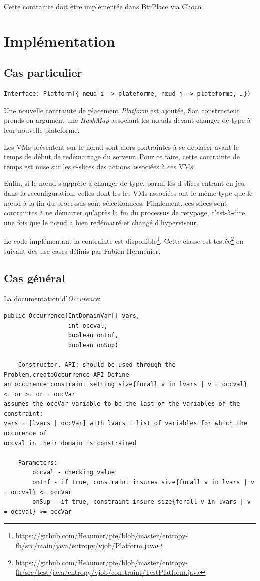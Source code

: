 \documentclass[a4paper]{article}
\begin{document}
Cette contrainte doit être implémentée dans BtrPlace via Choco.

\section{Implémentation}
\subsection{Cas particulier}
\begin{verbatim}
Interface: Platform({ nœud_i -> plateforme, nœud_j -> plateforme, …})
\end{verbatim}

Une nouvelle contrainte de placement \textit{Platform} est ajoutée. Son
constructeur prends en argument une \textit{HashMap} associant les
nœuds devant changer de type à leur nouvelle plateforme.

Les VMs présentent sur le nœud sont alors contraintes à se déplacer
avant le temps de début de redémarrage du serveur. Pour ce faire,
cette contrainte de temps est mise sur les c-slices des actions
associées à ces VMs.

Enfin, si le nœud s'apprête à changer de type, parmi les
d-slices entrant en jeu dans la reconfiguration, celles dont
les les VMs associées ont le même type que le nœud à la fin du processus
sont sélectionnées. Finalement, ces slices sont contraintes à ne démarrer
qu'après la fin du processus de retypage, c'est-à-dire une fois que
le nœud a bien redémarré et changé d'hyperviseur.

Le code implémentant la contrainte est
disponible\footnote{\url{https://github.com/Heaumer/pfe/blob/master/entropy-fh/src/main/java/entropy/vjob/Platform.java}}. Cette
classe est testée\footnote{\url{https://github.com/Heaumer/pfe/blob/master/entropy-fh/src/test/java/entropy/vjob/constraint/TestPlatform.java}}
en suivant des use-cases définis par Fabien Hermenier.

\subsection{Cas général}
La documentation d'\textit{Occurence}:
\begin{verbatim}
public Occurrence(IntDomainVar[] vars,
                  int occval,
                  boolean onInf,
                  boolean onSup)

    Constructor, API: should be used through the Problem.createOccurrence API Define
an occurence constraint setting size{forall v in lvars | v = occval} <= or >= or = occVar
assumes the occVar variable to be the last of the variables of the constraint:
vars = [lvars | occVar] with lvars = list of variables for which the occurence of
occval in their domain is constrained

    Parameters:
        occval - checking value
        onInf - if true, constraint insures size{forall v in lvars | v = occval} <= occVar
        onSup - if true, constraint insure size{forall v in lvars | v = occval} >= occVar

\end{verbatim}
\end{document}
